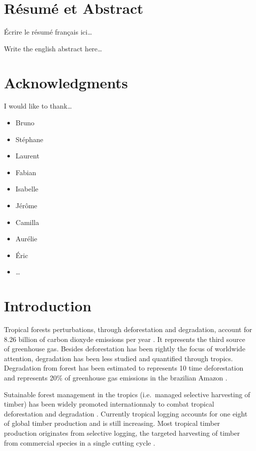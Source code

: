 \documentclass[12pt,]{article}
\providecommand{\tightlist}{%
\setlength{\itemsep}{0pt}\setlength{\parskip}{0pt}}
\let\oldsection\section
\renewcommand\section{\newpage\oldsection}
\theoremstyle{definition}
\theoremstyle{definition}
\theoremstyle{remark}
\begin{document}
\tableofcontents

\section*{Résumé et Abstract}\label{resume-et-abstract}

Écrire le résumé français ici\ldots{}

Write the english abstract here\ldots{}

\section*{Acknowledgments}\label{acknowledgments}

I would like to thank\ldots{}

\begin{itemize}
\tightlist
\item
  Bruno
\item
  Stéphane
\item
  Laurent
\item
  Fabian
\item
  Isabelle
\item
  Jérôme
\item
  Camilla
\item
  Aurélie
\item
  Éric
\item
  \ldots{}
\end{itemize}

\section*{Introduction}\label{introduction}

Tropical forests perturbations, through deforestation and degradation,
account for 8.26 billion of carbon dioxyde emissions per year
\citep{Pearson2017}. It represents the third source of greenhouse gas.
Besides deforestation has been rightly the focus of worldwide attention,
degradation has been less studied and quantified through tropics.
Degradation from forest has been estimated to represents 10 time
deforestation \citep{Herold2011} and represents 20\% of greenhouse gas
emissions in the brazilian Amazon \citep{Asner2005}.

Sutainable forest management in the tropics (i.e.~managed selective
harvesting of timber) has been widely promoted internationnaly to combat
tropical deforestation and degradation \citep{Zimmerman2012}. Currently
tropical logging accounts for one eight of global timber production
\citep{Blaser2011} and is still increasing. Most tropical timber
production originates from selective logging, the targeted harvesting of
timber from commercial species in a single cutting cycle
\citep{Martin2015}.
\end{document}
